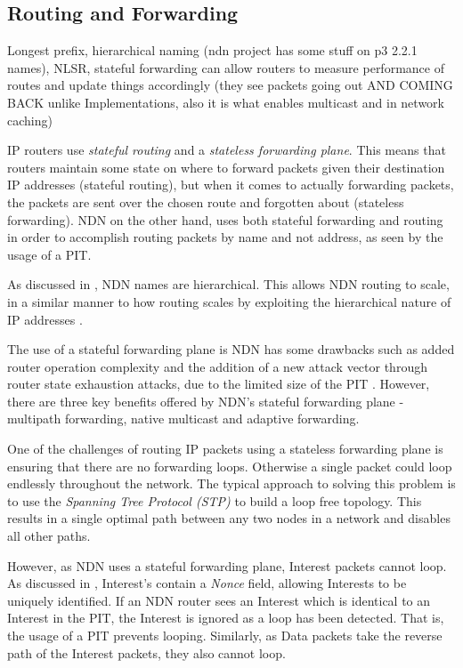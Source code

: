 \subsection{Routing and Forwarding}\label{sec:routing}
Longest prefix, hierarchical naming (ndn project has some stuff on p3 2.2.1 names), NLSR, stateful forwarding can allow routers to measure performance of routes and update things accordingly (they see packets going out AND COMING BACK unlike Implementations, also it is what enables multicast and in network caching)

IP routers use \textit{stateful routing} and a \textit{stateless forwarding plane}. This means that routers maintain some state on where to forward packets given their destination IP addresses (stateful routing), but when it comes to actually forwarding packets, the packets are sent over the chosen route and forgotten about (stateless forwarding). NDN on the other hand, uses both stateful forwarding and routing \cite{stateful-forwarding} in order to accomplish routing packets by name and not address, as seen by the usage of a PIT. 

As discussed in , NDN names are hierarchical. This allows NDN routing to scale, in a similar manner to how routing scales by exploiting the hierarchical nature of IP addresses \cite{stateful-forwarding}.

The use of a stateful forwarding plane is NDN has some drawbacks such as added router operation complexity and the addition of a new attack vector through router state exhaustion attacks, due to the limited size of the PIT \cite{case-against-stateful-forwarding}. However, there are three key benefits offered by NDN's stateful forwarding plane - multipath forwarding, native multicast and adaptive forwarding.

 \label{sec:multipath-forwarding}
One of the challenges of routing IP packets using a stateless forwarding plane is ensuring that there are no forwarding loops. Otherwise a single packet could loop endlessly throughout the network. The typical approach to solving this problem is to use the \textit{Spanning Tree Protocol (STP)} \cite{spanning-tree-protocol} to build a loop free topology. This results in a single optimal path between any two nodes in a network and disables all other paths.

However, as NDN uses a stateful forwarding plane, Interest packets cannot loop. As discussed in , Interest's contain a \textit{Nonce} field, allowing Interests to be uniquely identified. If an NDN router sees an Interest which is identical to an Interest in the PIT, the Interest is ignored as a loop has been detected. That is, the usage of a PIT prevents looping. Similarly, as Data packets take the reverse path of the Interest packets, they also cannot loop. 

